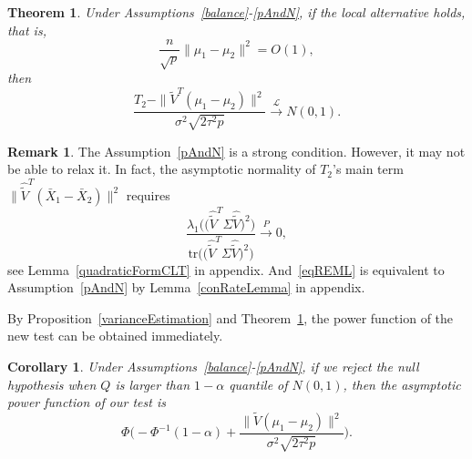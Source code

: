 \documentclass[review]{elsarticle}
\theoremstyle{plain}
\newtheorem{theorem}{\quad\quad Theorem}
\newtheorem{corollary}{\quad\quad Corollary}
\theoremstyle{definition}
\newtheorem{remark}{\quad\quad Remark}
\theoremstyle{remark}
\begin{document}
 


\begin{theorem}\label{myPanpan}
    Under Assumptions~\ref{balance}-\ref{pAndN},
if the local alternative holds, that is,
    $$\frac{n}{\sqrt{p}}\|\mu_1-\mu_2\|^2=O(1),$$
then 
\begin{equation*}
        \frac{T_2-\|\tilde{V}^T(\mu_1-\mu_2)\|^2}{\sigma^2\sqrt{2\tau^2 p}}\xrightarrow{\mathcal{L}}N(0,1).
\end{equation*}
\end{theorem} 
\begin{remark}
The Assumption~\ref{pAndN} is a strong condition.
However, it may not be able to relax it. In fact, the asymptotic normality of $T_2$'s main term $\|\hat{\tilde{V}}^T(\bar{X}_1-\bar{X}_2)\|^2$ requires 
\begin{equation}\label{eqREML}
    \frac{\lambda_1\big(\big(\hat{\tilde{V}}^T \Sigma \hat{\tilde{V}}\big)^2\big)}{\mathrm{tr}\big(\big(\hat{\tilde{V}}^T \Sigma \hat{\tilde{V}}\big)^2\big)
}\xrightarrow{P} 0,
\end{equation}
see Lemma~\ref{quadraticFormCLT} in appendix. And~\eqref{eqREML} is equivalent to Assumption~\ref{pAndN} by Lemma~\ref{conRateLemma} in appendix.
\end{remark}





By Proposition~\ref{varianceEstimation}  and Theorem~\ref{myPanpan}, the power function of the new test can be obtained immediately.


\begin{corollary}\label{testPowerh}
    Under Assumptions~\ref{balance}-\ref{pAndN},
    if we reject the null hypothesis when $Q$ is larger than $1-\alpha$ quantile of $N(0,1)$, then the asymptotic power function of our test is
    \begin{equation*}
        \Phi\Big(-\Phi^{-1}(1-\alpha)+\frac{\|\tilde{V}(\mu_1-\mu_2)\|^2}{\sigma^2\sqrt{2\tau^2p}}\Big).
    \end{equation*}
\end{corollary}
\end{document}

